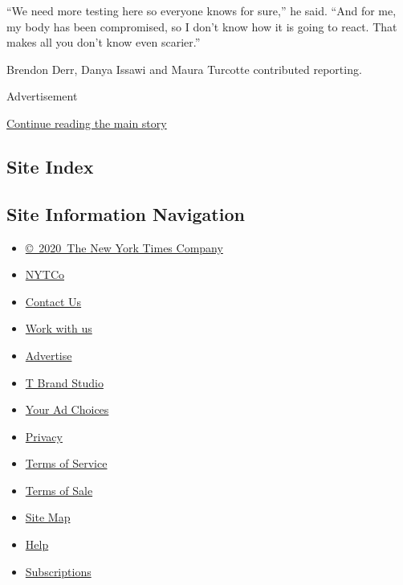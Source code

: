 ``We need more testing here so everyone knows for sure,'' he said. ``And
for me, my body has been compromised, so I don't know how it is going to
react. That makes all you don't know even scarier.''

Brendon Derr, Danya Issawi and Maura Turcotte contributed reporting.

Advertisement

\protect\hyperlink{after-bottom}{Continue reading the main story}

\hypertarget{site-index}{%
\subsection{Site Index}\label{site-index}}

\hypertarget{site-information-navigation}{%
\subsection{Site Information
Navigation}\label{site-information-navigation}}

\begin{itemize}
\tightlist
\item
  \href{https://help.nytimes3xbfgragh.onion/hc/en-us/articles/115014792127-Copyright-notice}{©~2020~The
  New York Times Company}
\end{itemize}

\begin{itemize}
\tightlist
\item
  \href{https://www.nytco.com/}{NYTCo}
\item
  \href{https://help.nytimes3xbfgragh.onion/hc/en-us/articles/115015385887-Contact-Us}{Contact
  Us}
\item
  \href{https://www.nytco.com/careers/}{Work with us}
\item
  \href{https://nytmediakit.com/}{Advertise}
\item
  \href{http://www.tbrandstudio.com/}{T Brand Studio}
\item
  \href{https://www.nytimes3xbfgragh.onion/privacy/cookie-policy\#how-do-i-manage-trackers}{Your
  Ad Choices}
\item
  \href{https://www.nytimes3xbfgragh.onion/privacy}{Privacy}
\item
  \href{https://help.nytimes3xbfgragh.onion/hc/en-us/articles/115014893428-Terms-of-service}{Terms
  of Service}
\item
  \href{https://help.nytimes3xbfgragh.onion/hc/en-us/articles/115014893968-Terms-of-sale}{Terms
  of Sale}
\item
  \href{https://spiderbites.nytimes3xbfgragh.onion}{Site Map}
\item
  \href{https://help.nytimes3xbfgragh.onion/hc/en-us}{Help}
\item
  \href{https://www.nytimes3xbfgragh.onion/subscription?campaignId=37WXW}{Subscriptions}
\end{itemize}
